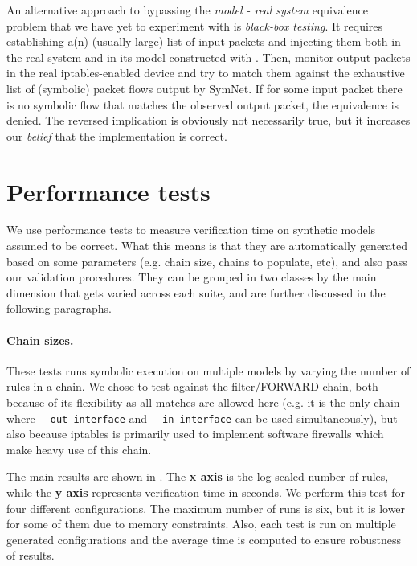 An alternative approach to bypassing the \emph{model - real system} equivalence
problem that we have yet to experiment with is \emph{black-box testing}.  It
requires establishing a(n) (usually large) list of input packets and injecting
them both in the real system and in its model constructed with \TOOL.  Then,
monitor output packets in the real iptables-enabled device and try to match
them against the exhaustive list of (symbolic) packet flows output by SymNet.
If for some input packet there is no symbolic flow that matches the observed
output packet, the equivalence is denied.  The reversed implication is
obviously not necessarily true, but it increases our \emph{belief} that the
implementation is correct.


\section{Performance tests}

We use performance tests to measure verification time on synthetic models
assumed to be correct.  What this means is that they are automatically
generated based on some parameters (e.g. chain size, chains to populate, etc),
and also pass our validation procedures.  They can be grouped in two classes by
the main dimension that gets varied across each suite, and are further
discussed in the following paragraphs.

\paragraph{Chain sizes.} These tests runs symbolic execution on multiple models
by varying the number of rules in a chain.  We chose to test against the
filter/FORWARD chain, both because of its flexibility as all matches are
allowed here (e.g.  it is the only chain where \lstinline{--out-interface} and
\lstinline{--in-interface} can be used simultaneously), but also because
iptables is primarily used to implement software firewalls which make heavy use
of this chain.

The main results are shown in .  The
\textbf{x axis} is the log-scaled number of rules, while the \textbf{y axis}
represents verification time in seconds.  We perform this test for four
different configurations.  The maximum number of runs is six, but it is lower
for some of them due to memory constraints.  Also, each test is run on multiple
generated configurations and the average time is computed to ensure robustness
of results.

